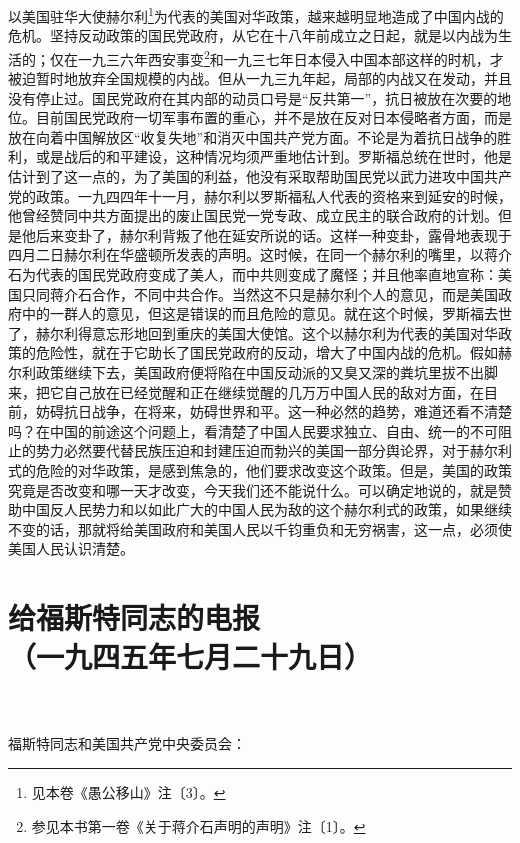 \documentclass[cn,11pt,chinese]{elegantbook}
\def\myformat#1{\hfil\hfil #1}
\begin{document}
以美国驻华大使赫尔利\footnote[1]{ 见本卷《愚公移山》注〔3〕。}为代表的美国对华政策，越来越明显地造成了中国内战的危机。坚持反动政策的国民党政府，从它在十八年前成立之日起，就是以内战为生活的；仅在一九三六年西安事变\footnote[2]{ 参见本书第一卷《关于蒋介石声明的声明》注〔1〕。}和一九三七年日本侵入中国本部这样的时机，才被迫暂时地放弃全国规模的内战。但从一九三九年起，局部的内战又在发动，并且没有停止过。国民党政府在其内部的动员口号是“反共第一”，抗日被放在次要的地位。目前国民党政府一切军事布置的重心，并不是放在反对日本侵略者方面，而是放在向着中国解放区“收复失地”和消灭中国共产党方面。不论是为着抗日战争的胜利，或是战后的和平建设，这种情况均须严重地估计到。罗斯福总统在世时，他是估计到了这一点的，为了美国的利益，他没有采取帮助国民党以武力进攻中国共产党的政策。一九四四年十一月，赫尔利以罗斯福私人代表的资格来到延安的时候，他曾经赞同中共方面提出的废止国民党一党专政、成立民主的联合政府的计划。但是他后来变卦了，赫尔利背叛了他在延安所说的话。这样一种变卦，露骨地表现于四月二日赫尔利在华盛顿所发表的声明。这时候，在同一个赫尔利的嘴里，以蒋介石为代表的国民党政府变成了美人，而中共则变成了魔怪；并且他率直地宣称：美国只同蒋介石合作，不同中共合作。当然这不只是赫尔利个人的意见，而是美国政府中的一群人的意见，但这是错误的而且危险的意见。就在这个时候，罗斯福去世了，赫尔利得意忘形地回到重庆的美国大使馆。这个以赫尔利为代表的美国对华政策的危险性，就在于它助长了国民党政府的反动，增大了中国内战的危机。假如赫尔利政策继续下去，美国政府便将陷在中国反动派的又臭又深的粪坑里拔不出脚来，把它自己放在已经觉醒和正在继续觉醒的几万万中国人民的敌对方面，在目前，妨碍抗日战争，在将来，妨碍世界和平。这一种必然的趋势，难道还看不清楚吗？在中国的前途这个问题上，看清楚了中国人民要求独立、自由、统一的不可阻止的势力必然要代替民族压迫和封建压迫而勃兴的美国一部分舆论界，对于赫尔利式的危险的对华政策，是感到焦急的，他们要求改变这个政策。但是，美国的政策究竟是否改变和哪一天才改变，今天我们还不能说什么。可以确定地说的，就是赞助中国反人民势力和以如此广大的中国人民为敌的这个赫尔利式的政策，如果继续不变的话，那就将给美国政府和美国人民以千钧重负和无穷祸害，这一点，必须使美国人民认识清楚。\\
\newpage\section*{\myformat{给福斯特同志的电报}\\\myformat{（一九四五年七月二十九日）}}\\~~\\
福斯特同志和美国共产党中央委员会：\\
\end{document}
